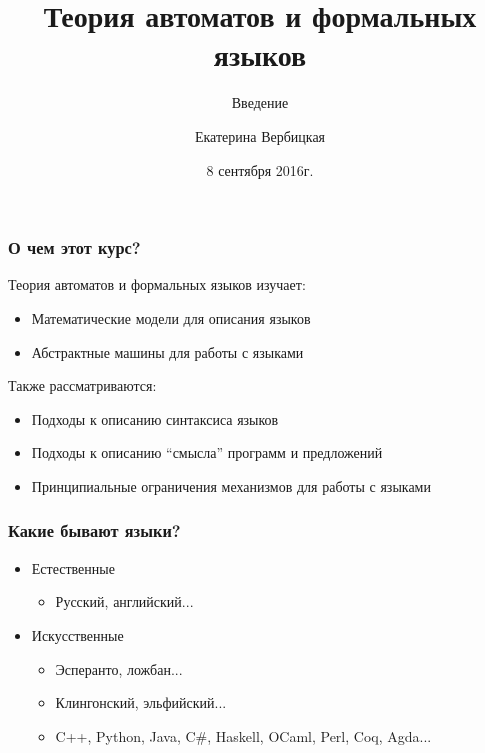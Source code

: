\documentclass{beamer}
\title[]{Теория автоматов и формальных языков}
\subtitle[]{Введение}
\institute[]{
Санкт-Петербургский государственный электротехнический университет <<ЛЭТИ>>\\
}
\author[]{Екатерина Вербицкая}
\date{8 сентября 2016г.}
\begin{document}
{
  \begin{frame}
    \titlepage
  \end{frame}
}

\begin{frame}[fragile]
  \transwipe[direction=90]
  \frametitle{О чем этот курс?}
  Теория автоматов и формальных языков изучает:
  \begin{itemize}
    \item Математические модели для описания языков
    \item Абстрактные машины для работы с языками
  \end{itemize}
  
  Также рассматриваются:
  \begin{itemize}
    \item Подходы к описанию синтаксиса языков
    \item Подходы к описанию ``смысла'' программ и предложений
    \item Принципиальные ограничения механизмов для работы с языками
  \end{itemize}
\end{frame}

\begin{frame}[fragile]
  \transwipe[direction=90]
  \frametitle{Какие бывают языки?}
  \pause
  \begin{itemize}
    \item Естественные 
    \begin{itemize}
      \item Русский, английский...
    \end{itemize}    
    \pause
    \item Искусственные
    \begin{itemize}
      \item Эсперанто, ложбан...
      \item Клингонский, эльфийский...
      \pause
      \item C++, Python, Java, C\#, Haskell, OCaml, Perl, Coq, Agda...
    \end{itemize}
  \end{itemize}
\end{frame}
\end{document}
